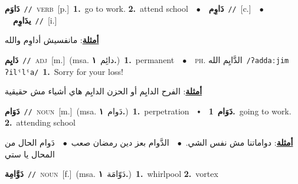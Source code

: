 \documentclass[10pt,a4paper,twoside]{article} %
\begin{document}
\begin{multicols}{2}
{\setlength\topsep{0pt}\textbf{\foreignlanguage{arabic}{دَاوَم}}\ {\color{gray}\texttt{//}\color{black}}\ \textsc{verb}\ [p.]\ \textbf{1.}~go to work.  \textbf{2.}~attend school\ \ $\bullet$\ \ \setlength\topsep{0pt}\textbf{\foreignlanguage{arabic}{دَاوِم}}\ {\color{gray}\texttt{//}\color{black}}\ [c.]\ \ $\bullet$\ \ \setlength\topsep{0pt}\textbf{\foreignlanguage{arabic}{يدَاوِم}}\ {\color{gray}\texttt{//}\color{black}}\ [i.]\  \begin{flushright}\color{gray}\foreignlanguage{arabic}{\textbf{\underline{\foreignlanguage{arabic}{أمثلة}}}: مانفسيش أداوِم والله}\end{flushright}\color{black}} \vspace{2mm}

{\setlength\topsep{0pt}\textbf{\foreignlanguage{arabic}{دَايِم}}\ {\color{gray}\texttt{//}\color{black}}\ \textsc{adj}\ [m.]\ \color{gray}(msa. \foreignlanguage{arabic}{دائِم}~\foreignlanguage{arabic}{\textbf{١.}})\color{black}\ \textbf{1.}~permanent\ \ $\bullet$\ \ \textsc{ph.} \color{gray} \foreignlanguage{arabic}{الدَّايِم الله}\color{black}\ {\color{gray}\texttt{/{\sffamily ʔaddaːjim ʔilˤlˤa}/}\color{black}}\ \textbf{1.}~Sorry for your loss!\  \begin{flushright}\color{gray}\foreignlanguage{arabic}{\textbf{\underline{\foreignlanguage{arabic}{أمثلة}}}: الفرح الدايِم أو الحزن الدايِم هاي أشياء مش حقيقية}\end{flushright}\color{black}} \vspace{2mm}

{\setlength\topsep{0pt}\textbf{\foreignlanguage{arabic}{دَوَام}}\ {\color{gray}\texttt{//}\color{black}}\ \textsc{noun}\ [m.]\ \color{gray}(msa. \foreignlanguage{arabic}{دَوام}~\foreignlanguage{arabic}{\textbf{١.}})\color{black}\ \textbf{1.}~perpetration\ \ $\smblkdiamond$\ \ \setlength\topsep{0pt}\textbf{\foreignlanguage{arabic}{دَوَام}}\ \textbf{1.}~going to work.  \textbf{2.}~attending school\  \begin{flushright}\color{gray}\foreignlanguage{arabic}{\textbf{\underline{\foreignlanguage{arabic}{أمثلة}}}: دواماتنا مش نفس الشي.\ $\bullet$\ \  الدَّوام بعز دين رمضان صعب\ $\bullet$\ \  دَوام الحال من المحال يا ستي}\end{flushright}\color{black}} \vspace{2mm}

{\setlength\topsep{0pt}\textbf{\foreignlanguage{arabic}{دَوَّامِة}}\ {\color{gray}\texttt{//}\color{black}}\ \textsc{noun}\ [f.]\ \color{gray}(msa. \foreignlanguage{arabic}{دَوّامَة}~\foreignlanguage{arabic}{\textbf{١.}})\color{black}\ \textbf{1.}~whirlpool  \textbf{2.}~vortex\ } \vspace{2mm}


\end{multicols}
\end{document}
